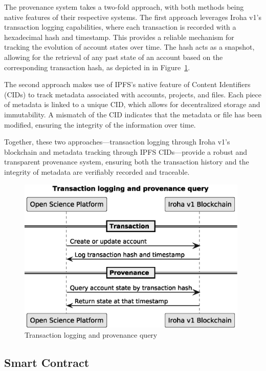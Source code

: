 \documentclass{article}
\begin{document}
The provenance system takes a two-fold approach, with both methods being native features of their respective systems. The first approach leverages Iroha v1’s transaction logging capabilities, where each transaction is recorded with a hexadecimal hash and timestamp. This provides a reliable mechanism for tracking the evolution of account states over time. The hash acts as a snapshot, allowing for the retrieval of any past state of an account based on the corresponding transaction hash, as depicted in in Figure~\ref{fig:provenance}.

The second approach makes use of IPFS’s native feature of Content Identifiers (CIDs) to track metadata associated with accounts, projects, and files. Each piece of metadata is linked to a unique CID, which allows for decentralized storage and immutability. A mismatch of the CID indicates that the metadata or file has been modified, ensuring the integrity of the information over time.

Together, these two approaches—transaction logging through Iroha v1’s blockchain and metadata tracking through IPFS CIDs—provide a robust and transparent provenance system, ensuring both the transaction history and the integrity of metadata are verifiably recorded and traceable.


\begin{figure}[htbp]
      \centering
      \includegraphics[width=0.98\textwidth, keepaspectratio]{provenance_timeline.eps}
      \caption{Transaction logging and provenance query}
      \label{fig:provenance}
\end{figure}



\subsection{Smart Contract}
\end{document}
